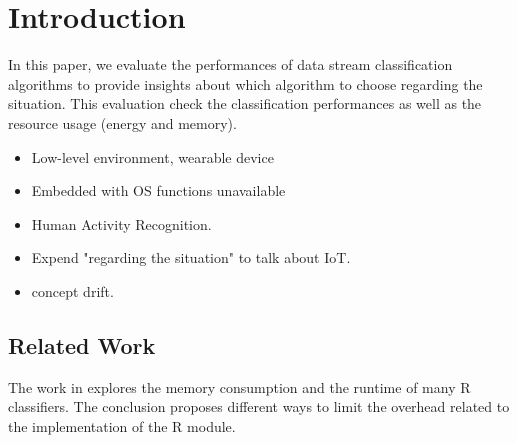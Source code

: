 \section{Introduction}
\label{sec:introduction}

In this paper, we evaluate the performances of
data stream classification algorithms to provide
insights about which algorithm to choose regarding
the situation.
This evaluation check the classification
performances as well as the resource usage (energy
and memory).

\begin{itemize}
		\item Low-level environment, wearable device
		\item Embedded with OS functions unavailable
		\item Human Activity Recognition.
		\item Expend "regarding the situation" to talk about IoT.
		\item concept drift.
\end{itemize}




\subsection{Related Work}
The work in \cite{memory_consumption_machine_learning}
explores the memory consumption and
the runtime of many R classifiers. The conclusion proposes different ways to
limit the overhead related to the implementation of the R module.

